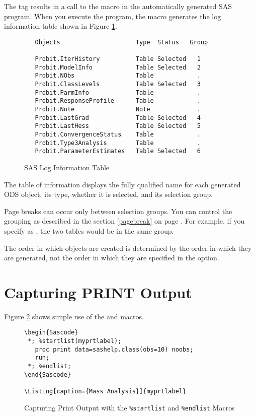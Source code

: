 \documentclass[article,oneside]{memoir}
\begin{document}
The  tag results in a call to the  macro in the
automatically generated SAS program. When you execute the program,
the  macro generates the log information table shown in
Figure \ref{loginfo}.

\begin{figure}[H]
\begin{snugshade}
\begin{verbatim}
   Objects                     Type  Status   Group

   Probit.IterHistory          Table Selected   1
   Probit.ModelInfo            Table Selected   2
   Probit.NObs                 Table            .
   Probit.ClassLevels          Table Selected   3
   Probit.ParmInfo             Table            .
   Probit.ResponseProfile      Table            .
   Probit.Note                 Note             .
   Probit.LastGrad             Table Selected   4
   Probit.LastHess             Table Selected   5
   Probit.ConvergenceStatus    Table            .
   Probit.Type3Analysis        Table            .
   Probit.ParameterEstimates   Table Selected   6
\end{verbatim}
\end{snugshade}
\caption{SAS Log Information Table}\label{loginfo}
\end{figure}

  The table of information displays the fully qualified name for each
  generated ODS object, its type, whether it is selected, and its
  selection group.

  Page breaks can occur only between
  selection groups. You can control the grouping
  as described in the section \ref{pagebreak} on page \pageref{pagebreak}.
  For example, if you specify
 as ,
  the two tables would be in the same group.

  The order in which objects are created is determined by the
  order in which they are generated, not the order in which they are
  specified in the  option.

\section{Capturing PRINT Output}
  Figure \ref{printoutput} shows simple use of the  and 
  macros.

\begin{figure}[H]
\begin{snugshade}
\begin{verbatim}
\begin{Sascode}
 *; %startlist(myprtlabel);
   proc print data=sashelp.class(obs=10) noobs;
   run;
 *; %endlist;
\end{Sascode}

\Listing[caption={Mass Analysis}]{myprtlabel}
\end{verbatim}
\end{snugshade}
\caption{Capturing Print Output with the \texttt{\%startlist} and
\texttt{\%endlist} Macros}\label{printoutput}
\end{figure}
\end{document}
